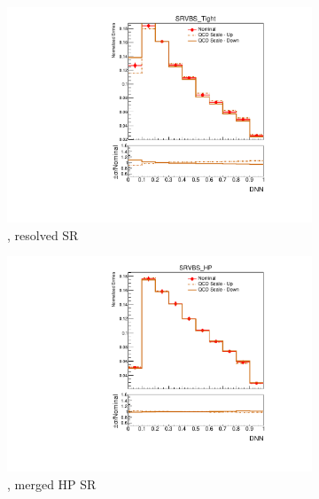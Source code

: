 \begin{figure}[ht]
    \centering
    \begin{subfigure}[b]{0.3\textwidth}
        \includegraphics[width=\textwidth]{figures/1lep/PDFUnc/QCDScale/W_0ptag2pjet_0ptv_SRVBS_Tight_DNN_SysTheoryQCD_W__1up_Norm.pdf}
        \caption{\Wjets, resolved SR}
    \end{subfigure}
    \begin{subfigure}[b]{0.3\textwidth}
        \includegraphics[width=\textwidth]{figures/1lep/PDFUnc/QCDScale/W_0ptag1pfat0pjet_0ptv_SRVBS_HP_DNN_SysTheoryQCD_W__1up_Norm.pdf}
        \caption{\Wjets, merged HP SR}
    \end{subfigure}
    \begin{subfigure}[b]{0.3\textwidth}

\end{subfigure}
\end{figure}
